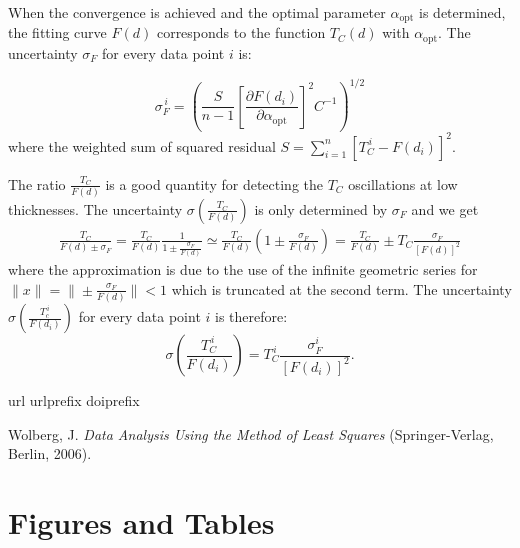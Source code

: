 \documentclass[reprint,onecolumn,superscriptaddress,a4paper,nofootinbib,floatfix]{revtex4-1}
\begin{document}
When the convergence is achieved and the optimal parameter $\alpha_\text{opt}$ is determined, the fitting curve $F(d)$ corresponds to the function $T_C(d)$ with $\alpha_\text{opt}$. The uncertainty $\sigma_F$ for every data point $i$ is:

\begin{equation}\tag{S7}
\sigma_F^{\,i}=\left(\frac{S}{n-1}\left[\frac{\partial F(d_i)}{\partial\alpha_\text{opt}}\right]^2 C^{-1}\right)^{1/2}
\end{equation}
where the weighted sum of squared residual $S=\sum_{i=1}^n\left[T_C^{\,i}-F(d_i)\right]^2$.

The ratio $\frac{T_C}{F(d)}$ is a good quantity for detecting the $T_C$ oscillations at low thicknesses. The uncertainty $\sigma\left(\frac{T_C}{F(d)}\right)$ is only determined by $\sigma_F$ and we get
\begin{equation}\tag{S8}
\begin{aligned}
\frac{T_C}{F(d)\pm\sigma_F}=\frac{T_C}{F(d)}\frac{1}{1\pm\frac{\sigma_F}{F(d)}}\simeq\frac{T_C}{F(d)}\left(1\pm\frac{\sigma_F}{F(d)}\right)=\frac{T_C}{F(d)}\pm T_C\frac{\sigma_F}{\left[F(d)\right]^2}
\end{aligned}
\end{equation}
where the approximation is due to the use of the infinite geometric series for $\|x\|=\|\pm\frac{\sigma_F}{F(d)}\|<1$ which is truncated at the second term.
The uncertainty $\sigma\left(\frac{T_c^{\,i}}{F(d_i)}\right)$ for every data point $i$ is therefore:
\begin{equation}\tag{S9}
\sigma\left(\frac{T_C^{\,i}}{F(d_i)}\right)=T_C^{\,i}\frac{\sigma_F^i}{[F(d_i)]^2}.
\end{equation}

\begin{thebibliography}{10}
\expandafter\ifx\csname url\endcsname\relax
  \def\url#1{\texttt{#1}}\fi
\expandafter\ifx\csname urlprefix\endcsname\relax\def\urlprefix{URL }\fi
\expandafter\ifx\csname doiprefix\endcsname\relax\def\doiprefix{DOI }\fi
\providecommand{\bibinfo}[2]{#2}
\providecommand{\eprint}[2][]{\url{#2}}

\bibinfo{author}{Wolberg, J.}
\newblock \emph{\bibinfo{title}{{Data Analysis Using the Method of Least
  Squares}}} (\bibinfo{publisher}{Springer-Verlag, Berlin},
  \bibinfo{year}{2006}).

\end{thebibliography}

\section*{Figures and Tables}
\end{document}
